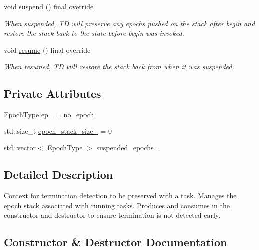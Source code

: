 \begin{DoxyCompactItemize}
void \hyperlink{structvt_1_1ctx_1_1_t_d_aa0a190994d71eda5321da08464a810a9}{suspend} () final override
\begin{DoxyCompactList}\small\item\em When suspended, {\ttfamily \hyperlink{structvt_1_1ctx_1_1_t_d}{TD}} will preserve any epochs pushed on the stack after begin and restore the stack back to the state before begin was invoked. \end{DoxyCompactList}\item 
void \hyperlink{structvt_1_1ctx_1_1_t_d_aa21b5afe01312244e338eefecde83bc6}{resume} () final override
\begin{DoxyCompactList}\small\item\em When resumed, {\ttfamily \hyperlink{structvt_1_1ctx_1_1_t_d}{TD}} will restore the stack back from when it was suspended. \end{DoxyCompactList}\end{DoxyCompactItemize}
\subsection*{Private Attributes}
\begin{DoxyCompactItemize}
\item 
\hyperlink{namespacevt_a985a5adf291c34a3ca263b3378388236}{Epoch\+Type} \hyperlink{structvt_1_1ctx_1_1_t_d_a27c1d8888dd9b0fcc0b6a8f31f7ebdb7}{ep\+\_\+} = no\+\_\+epoch
\item 
std\+::size\+\_\+t \hyperlink{structvt_1_1ctx_1_1_t_d_ac8377f072ca41920586f303b7b987823}{epoch\+\_\+stack\+\_\+size\+\_\+} = 0
\item 
std\+::vector$<$ \hyperlink{namespacevt_a985a5adf291c34a3ca263b3378388236}{Epoch\+Type} $>$ \hyperlink{structvt_1_1ctx_1_1_t_d_aa960a5f0ddf7725eb720d8bc68f1325f}{suspended\+\_\+epochs\+\_\+}
\end{DoxyCompactItemize}


\subsection{Detailed Description}
\hyperlink{structvt_1_1ctx_1_1_context}{Context} for termination detection to be preserved with a task. Manages the epoch stack associated with running tasks. Produces and consumes in the constructor and destructor to ensure termination is not detected early. 

\subsection{Constructor \& Destructor Documentation}
\mbox{\label{structvt_1_1ctx_1_1_t_d_ade8d2b390d1b4a484dd9f5f20546bc91}} 
